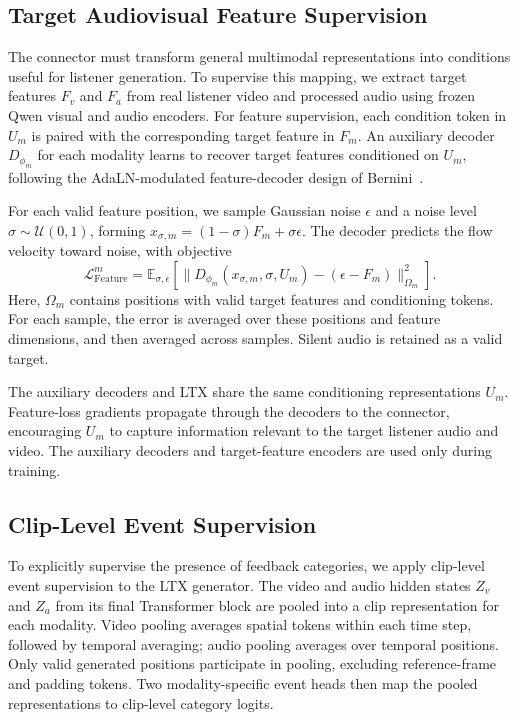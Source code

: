 \subsection{Target Audiovisual Feature Supervision}
\label{sec:feature}
The connector must transform general multimodal representations into
conditions useful for listener generation. To supervise this mapping,
we extract target features $F_v$ and $F_a$ from real listener video and
processed audio using frozen Qwen visual and audio encoders. 
For feature supervision, each condition token in $U_m$ is
paired with the corresponding target feature in $F_m$.
An auxiliary decoder $D_{\phi_m}$ for each modality learns
to recover target features conditioned on $U_m$, following the
AdaLN-modulated feature-decoder design of Bernini~\cite{bernini_pending}.

For each valid feature position, we sample Gaussian noise $\epsilon$
and a noise level $\sigma\sim\mathcal U(0,1)$, forming
$x_{\sigma,m}=(1-\sigma)F_m+\sigma\epsilon$. The decoder predicts
the flow velocity toward noise, with objective
\begin{equation}
 \mathcal L_{\mathrm{Feature}}^m =
 \mathbb E_{\sigma,\epsilon}\!\left[
 \big\|D_{\phi_m}(x_{\sigma,m},\sigma,U_m)
       -(\epsilon-F_m)\big\|_{\Omega_m}^{2}\right].
\label{eq:feature}
\end{equation}
Here, $\Omega_m$ contains positions with valid target features
and conditioning tokens. For each sample, the error is averaged
over these positions and feature dimensions, and then averaged
across samples. Silent audio is retained as a valid target.

The auxiliary decoders and LTX share the same conditioning
representations $U_m$. Feature-loss gradients propagate through
the decoders to the connector, encouraging $U_m$ to capture
information relevant to the target listener audio and video.
The auxiliary decoders and target-feature encoders are used
only during training.

\subsection{Clip-Level Event Supervision}
\label{sec:event}
To explicitly supervise the presence of feedback categories,
we apply clip-level event supervision to the LTX generator.
The video and audio hidden states $Z_v$ and $Z_a$ from its
final Transformer block are pooled into a clip representation
for each modality. Video pooling averages spatial tokens
within each time step, followed by temporal averaging;
audio pooling averages over temporal positions.
Only valid generated positions participate in pooling,
excluding reference-frame and padding tokens.
Two modality-specific event heads then map the pooled
representations to clip-level category logits.

